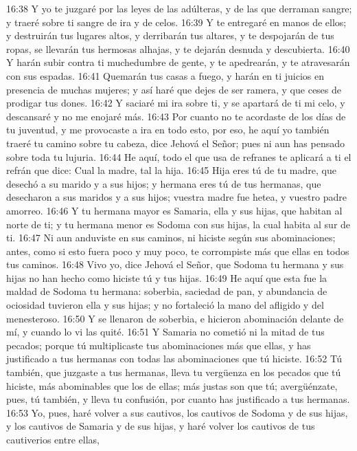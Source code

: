 16:38 Y yo te juzgaré por las leyes de las adúlteras, y de las que derraman sangre; y traeré sobre ti sangre de ira y de celos.   
16:39 Y te entregaré en manos de ellos; y destruirán tus lugares altos, y derribarán tus altares, y te despojarán de tus ropas, se llevarán tus hermosas alhajas, y te dejarán desnuda y descubierta.   
16:40 Y harán subir contra ti muchedumbre de gente, y te apedrearán, y te atravesarán con sus espadas.   
16:41 Quemarán tus casas a fuego, y harán en ti juicios en presencia de muchas mujeres; y así haré que dejes de ser ramera, y que ceses de prodigar tus dones.   
16:42 Y saciaré mi ira sobre ti, y se apartará de ti mi celo, y descansaré y no me enojaré más.   
16:43 Por cuanto no te acordaste de los días de tu juventud, y me provocaste a ira en todo esto, por eso, he aquí yo también traeré tu camino sobre tu cabeza, dice Jehová el Señor; pues ni aun has pensado sobre toda tu lujuria.   
16:44 He aquí, todo el que usa de refranes te aplicará a ti el refrán que dice: Cual la madre, tal la hija.   
16:45 Hija eres tú de tu madre, que desechó a su marido y a sus hijos; y hermana eres tú de tus hermanas, que desecharon a sus maridos y a sus hijos; vuestra madre fue hetea, y vuestro padre amorreo.   
16:46 Y tu hermana mayor es Samaria, ella y sus hijas, que habitan al norte de ti; y tu hermana menor es Sodoma con sus hijas, la cual habita al sur de ti.   
16:47 Ni aun anduviste en sus caminos, ni hiciste según sus abominaciones; antes, como si esto fuera poco y muy poco, te corrompiste más que ellas en todos tus caminos.   
16:48 Vivo yo, dice Jehová el Señor, que Sodoma tu hermana y sus hijas no han hecho como hiciste tú y tus hijas.   
16:49 He aquí que esta fue la maldad de Sodoma tu hermana: soberbia, saciedad de pan, y abundancia de ociosidad tuvieron ella y sus hijas; y no fortaleció la mano del afligido y del menesteroso.   
16:50 Y se llenaron de soberbia, e hicieron abominación delante de mí, y cuando lo vi las quité.   
16:51 Y Samaria no cometió ni la mitad de tus pecados; porque tú multiplicaste tus abominaciones más que ellas, y has justificado a tus hermanas con todas las abominaciones que tú hiciste. 
16:52 Tú también, que juzgaste a tus hermanas, lleva tu vergüenza en los pecados que tú hiciste, más abominables que los de ellas; más justas son que tú; avergüénzate, pues, tú también, y lleva tu confusión, por cuanto has justificado a tus hermanas.   
16:53 Yo, pues, haré volver a sus cautivos, los cautivos de Sodoma y de sus hijas, y los cautivos de Samaria y de sus hijas, y haré volver los cautivos de tus cautiverios entre ellas,   
